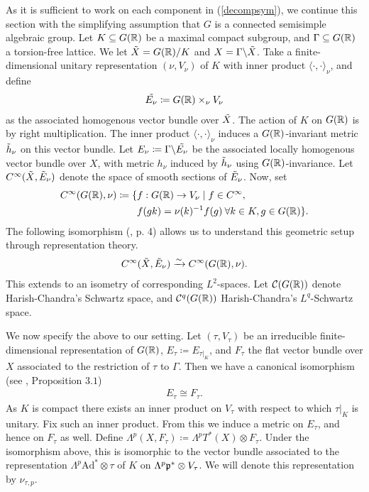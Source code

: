 As it is sufficient to work on each component in (\ref{decompsym}), we continue this section with the simplifying assumption that $G$ is a connected semisimple algebraic group. Let $K\subseteq G(\mathbb{R})$ be a maximal compact subgroup, and $\Gamma\subseteq G(\mathbb{R})$ a torsion-free lattice. We let $\Tilde{X}=G(\mathbb{R})/K$ and $X=\Gamma\backslash \Tilde{X}$. Take a finite-dimensional unitary representation $(\nu,V_\nu)$ of $K$ with inner product $\langle\cdot,\cdot\rangle_\nu$, and define
\begin{align*}
    \Tilde{E_\nu} \coloneqq G(\mathbb{R})\times_\nu V_\nu
\end{align*}
as the associated homogenous vector bundle over $\Tilde{X}$. The action of $K$ on $G(\mathbb{R})$ is by right multiplication. The inner product $\langle\cdot,\cdot\rangle_\nu$ induces a $G(\mathbb{R})$-invariant metric $\Tilde{h}_\nu$ on this vector bundle. 
Let $E_\nu\coloneqq \Gamma\backslash\Tilde{E_\nu}$ be the associated locally homogenous vector bundle over $X$, with metric $h_\nu$ induced by $\Tilde{h}_\nu$ using $G(\mathbb{R})$-invariance. 
Let $C^\infty(\Tilde{X},\Tilde{E}_\nu)$ denote the space of smooth sections of $\Tilde{E}_\nu$. Now, set
\begin{align*}
    C^\infty(G(\mathbb{R}),\nu) \coloneqq \lbrace &f:G(\mathbb{R})\to V_\nu \mid f\in C^\infty,\\
    &f(gk) = \nu(k)^{-1}f(g) \:\forall k\in K,g\in G(\mathbb{R})\rbrace.
\end{align*}
The following isomorphism (\cite{Miatello}, p. 4) allows us to understand this geometric setup through representation theory.
\begin{align}\label{c-inf spaces}
    C^\infty(\Tilde{X},\Tilde{E}_\nu) \xrightarrow{\sim} C^\infty(G(\mathbb{R}),\nu).
\end{align}
\noindent This extends to an isometry of corresponding $L^2$-spaces. Let $\mathcal{C}(G(\mathbb{R}))$ denote Harish-Chandra's Schwartz space, and $\mathcal{C}^q(G(\mathbb{R}))$ Harish-Chandra's $L^q$-Schwartz space. 

We now specify the above to our setting. Let $(\tau,V_\tau)$ be an irreducible finite-dimensional representation of $G(\mathbb{R})$, $E_\tau\coloneqq E_{\tau|_K}$, and $F_\tau$ the flat vector bundle over $X$ associated to the restriction of $\tau$ to $\Gamma$. Then we have a canonical isomorphism (see \cite{MM}, Proposition $3.1$)
\begin{align*}
    E_\tau\cong F_\tau.
\end{align*}
As $K$ is compact there exists an inner product on $V_\tau$ with respect to which $\tau|_K$ is unitary. Fix such an inner product. From this we induce a metric on $E_\tau$, and hence on $F_\tau$ as well. Define $\Lambda^p(X,F_\tau)\coloneqq \Lambda^pT^*(X)\otimes F_\tau$. Under the isomorphism above, this is isomorphic to the vector bundle associated to the representation $\Lambda^p\text{Ad}^*\otimes \tau$ of $K$ on $\Lambda^p\mathfrak{p}^*\otimes V_\tau$. We will denote this representation by $\nu_{\tau,p}$. 

